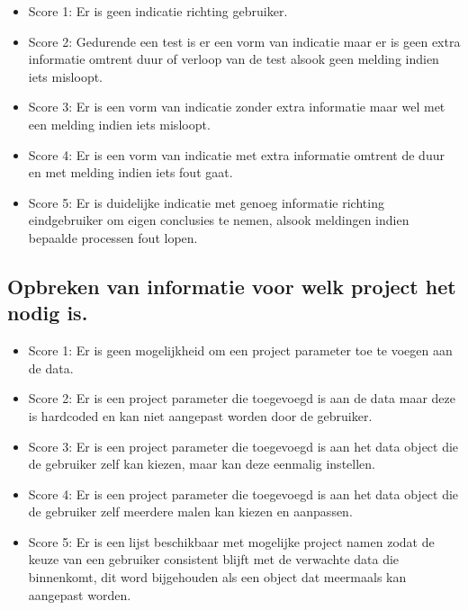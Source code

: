 \begin{itemize}
    \item Score 1: Er is geen indicatie richting gebruiker.
    \item Score 2: Gedurende een test is er een vorm van indicatie maar er is geen extra informatie omtrent duur of verloop van de test alsook geen melding indien iets misloopt.
    \item Score 3: Er is een vorm van indicatie zonder extra informatie maar wel met een melding indien iets misloopt.
    \item Score 4: Er is een vorm van indicatie met extra informatie omtrent de duur en met melding indien iets fout gaat.
    \item Score 5: Er is duidelijke indicatie met genoeg informatie richting eindgebruiker om eigen conclusies te nemen, alsook meldingen indien bepaalde processen fout lopen.
\end{itemize}

\subsection{Opbreken van informatie voor welk project het nodig is.}
\begin{itemize}
    \item Score 1: Er is geen mogelijkheid om een project parameter toe te voegen aan de data.
    \item Score 2: Er is een project parameter die toegevoegd is aan de data maar deze is hardcoded en kan niet aangepast worden door de gebruiker.
    \item Score 3: Er is een project parameter die toegevoegd is aan het data object die de gebruiker zelf kan kiezen, maar kan deze eenmalig instellen. 
    \item Score 4: Er is een project parameter die toegevoegd is aan het data object die de gebruiker zelf meerdere malen kan kiezen en aanpassen.
    \item Score 5: Er is een lijst beschikbaar met mogelijke project namen zodat de keuze van een gebruiker consistent blijft met de verwachte data die binnenkomt, dit word bijgehouden als een object dat meermaals kan aangepast worden.
\end{itemize}
